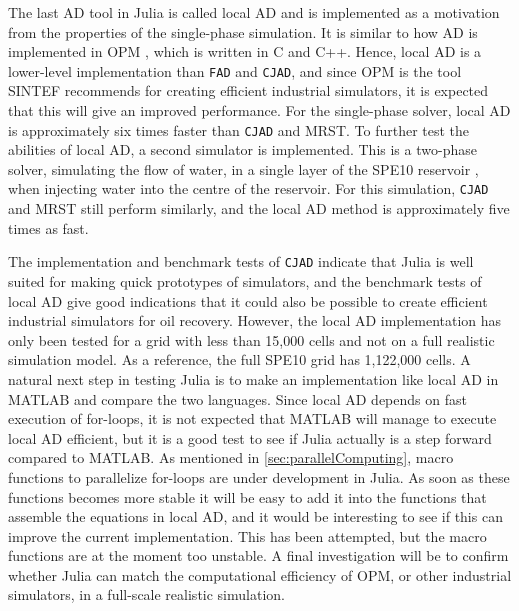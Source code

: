 The last AD tool in Julia is called local AD and is implemented as a motivation from the properties of the single-phase simulation. It is similar to how AD is implemented in OPM \emph{\citep{opm}}, which is written in C and C++. Hence, local AD is a lower-level implementation than \texttt{FAD} and \texttt{CJAD}, and since OPM is the tool SINTEF recommends for creating efficient industrial simulators, it is expected that this will give an improved performance. For the single-phase solver, local AD is approximately six times faster than \texttt{CJAD} and MRST. To further test the abilities of local AD, a second simulator is implemented. This is a two-phase solver, simulating the flow of water, in a single layer of the SPE10 reservoir \emph{\citep{SPE10}}, when injecting water into the centre of the reservoir. For this simulation, \texttt{CJAD} and MRST still perform similarly, and the local AD method is approximately five times as fast.

The implementation and benchmark tests of \texttt{CJAD} indicate that Julia is well suited for making quick prototypes of simulators, and the benchmark tests of local AD give good indications that it could also be possible to create efficient industrial simulators for oil recovery. However, the local AD implementation has only been tested for a grid with less than 15,000 cells and not on a full realistic simulation model. As a reference, the full SPE10 grid has 1,122,000 cells. A natural next step in testing Julia is to make an implementation like local AD in MATLAB and compare the two languages. Since local AD depends on fast execution of for-loops, it is not expected that MATLAB will manage to execute local AD efficient, but it is a good test to see if Julia actually is a step forward compared to MATLAB. As mentioned in \autoref{sec:parallelComputing}, macro functions to parallelize for-loops are under development in Julia. As soon as these functions becomes more stable it will be easy to add it into the functions that assemble the equations in local AD, and it would be interesting to see if this can improve the current implementation. This has been attempted, but the macro functions are at the moment too unstable. A final investigation will be to confirm whether Julia can match the computational efficiency of OPM, or other industrial simulators, in a full-scale realistic simulation. 

